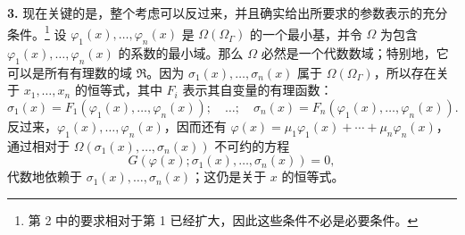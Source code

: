\textbf{3.} 现在关键的是，整个考虑可以反过来，并且确实给出所要求的参数表示的充分条件。\footnote{第 2 中的要求相对于第 1 已经扩大，因此这些条件不必是必要条件。} 设 $\varphi_1(x),\ldots,\varphi_n(x)$ 是 $\Omega(\Omega_\Gamma)$ 的一个最小基，并令 $\Omega$ 为包含 $\varphi_1(x),\ldots,\varphi_n(x)$ 的系数的最小域。那么 $\Omega$ 必然是一个代数数域；特别地，它可以是所有有理数的域 $\mathfrak R$。因为 $\sigma_1(x),\ldots,\sigma_n(x)$ 属于 $\Omega(\Omega_\Gamma)$，所以存在关于 $x_1,
\ldots,x_n$ 的恒等式，其中 $F_i$ 表示其自变量的有理函数：
\begin{equation}\tag{5}
\sigma_1(x)=F_1(\varphi_1(x),\ldots,\varphi_n(x));\quad\ldots;\quad
\sigma_n(x)=F_n(\varphi_1(x),\ldots,\varphi_n(x)).
\end{equation}
反过来，$\varphi_1(x),\ldots,\varphi_n(x)$，因而还有 $\varphi(x)=\mu_1\varphi_1(x)+\cdots+\mu_n\varphi_n(x)$，通过相对于 $\Omega(\sigma_1(x),\ldots,\sigma_n(x))$ 不可约的方程
\begin{equation}\tag{6}
G(\varphi(x);\sigma_1(x),\ldots,\sigma_n(x))=0,
\end{equation}
代数地依赖于 $\sigma_1(x),\ldots,\sigma_n(x)$；这仍是关于 $x$ 的恒等式。

